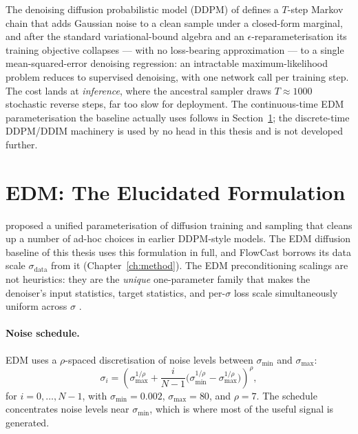 The denoising diffusion probabilistic model (DDPM) of \citet{ho2020ddpm} defines a $T$-step Markov chain that adds Gaussian noise to a clean sample under a closed-form marginal, and after the standard variational-bound algebra and an $\epsilon$-reparameterisation its training objective collapses --- with no loss-bearing approximation --- to a single mean-squared-error denoising regression: an intractable maximum-likelihood problem reduces to supervised denoising, with one network call per training step. The cost lands at \emph{inference}, where the ancestral sampler draws $T \approx 1000$ stochastic reverse steps, far too slow for deployment. The continuous-time EDM parameterisation the baseline actually uses follows in Section~\ref{sec:bg-edm}; the discrete-time DDPM/DDIM machinery is used by no head in this thesis and is not developed further.

\section{EDM: The Elucidated Formulation}
\label{sec:bg-edm}

\citet{karras2022elucidating} proposed a unified parameterisation of diffusion training and sampling that cleans up a number of ad-hoc choices in earlier DDPM-style models. The EDM diffusion baseline of this thesis uses this formulation in full, and FlowCast borrows its data scale $\sigma_{\text{data}}$ from it (Chapter~\ref{ch:method}). The EDM preconditioning scalings are not heuristics: they are the \emph{unique} one-parameter family that makes the denoiser's input statistics, target statistics, and per-$\sigma$ loss scale simultaneously uniform across $\sigma$ \citep{karras2022elucidating}.

\paragraph{Noise schedule.} EDM uses a $\rho$-spaced discretisation of noise levels between $\sigma_{\min}$ and $\sigma_{\max}$:
\begin{equation}
  \sigma_i = \left(\sigma_{\max}^{1/\rho} + \frac{i}{N-1}\bigl(\sigma_{\min}^{1/\rho} - \sigma_{\max}^{1/\rho}\bigr)\right)^{\rho},
  \label{eq:karras-schedule}
\end{equation}
for $i = 0, \ldots, N-1$, with $\sigma_{\min} = 0.002$, $\sigma_{\max} = 80$, and $\rho = 7$. The schedule concentrates noise levels near $\sigma_{\min}$, which is where most of the useful signal is generated.

